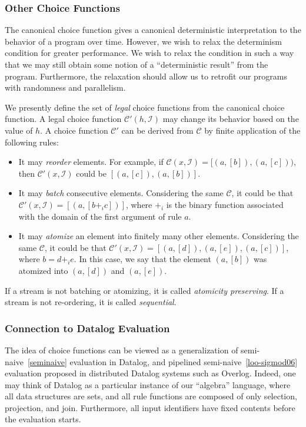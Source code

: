 \subsubsection{Other Choice Functions}

The canonical choice function gives a canonical deterministic interpretation to the behavior of a program over time.  However, we wish to relax the determinism condition for greater performance.  We wish to relax the condition in such a way that we may still obtain some notion of a ``deterministic result'' from the program.  Furthermore, the relaxation should allow us to retrofit our programs with randomness and parallelism.

We presently define the set of {\em legal} choice functions from the canonical choice function.  A legal choice function $\mathcal{C}'(h,\mathcal{I})$ may change its behavior based on the value of $h$.  A choice function $\mathcal{C}'$ can be derived from $\mathcal{C}$ by finite application of the following rules:

\begin{itemize}
\item It may {\em reorder} elements.  For example, if $\mathcal{C}(x,\mathcal{I}) = [(a,[b]), (a,[c]))$, then $\mathcal{C}'(x,\mathcal{I})$ could be $[(a,[c]),(a,[b])]$.

\item It may {\em batch} consecutive elements.  Considering the same $\mathcal{C}$, it could be that $\mathcal{C}'(x,\mathcal{I}) = [(a,[b +_i c])]$, where $+_i$ is the binary function associated with the domain of the first argument of rule $a$.

\item It may {\em atomize} an element into finitely many other elements.  Considering the same $\mathcal{C}$, it could be that $\mathcal{C}'(x,\mathcal{I}) = [(a,[d]), (a,[e]), (a,[c])]$, where $b = d +_i e$.  In this case, we say that the element $(a,[b])$ was atomized into $(a,[d])$ and $(a,[e])$.
\end{itemize}

If a stream is not batching or atomizing, it is called {\em atomicity preserving}.  If a stream is not re-ordering, it is called {\em sequential}.


\subsubsection{Connection to Datalog Evaluation}

The idea of choice functions can be viewed as a generalization of semi-naive~\ref{seminaive} evaluation in Datalog, and pipelined semi-naive~\ref{loo-sigmod06} evaluation proposed in distributed Datalog systems such as Overlog.  Indeed, one may think of Datalog as a particular instance of our ``algebra'' language, where all data structures are sets, and all rule functions are composed of only selection, projection, and join.  Furthermore, all input identifiers have fixed contents before the evaluation starts.

